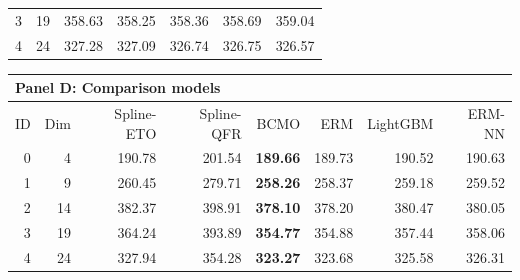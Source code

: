 \begin{table}[htbp]
\begin{tabular}{rrrrrrr}
3 & 19 & 358.63 & 358.25 & 358.36 & 358.69 & 359.04 \\
4 & 24 & 327.28 & 327.09 & 326.74 & 326.75 & 326.57 \\
\bottomrule
\end{tabular}
\par\medskip
\begin{tabular}{rrrrrrrr}
\toprule
\multicolumn{8}{l}{\textbf{Panel D: Comparison models}} \\
\midrule
ID & Dim & Spline-ETO & Spline-QFR & BCMO & ERM & LightGBM & ERM-NN \\
\midrule
0 & 4 & 190.78 & 201.54 & \textbf{189.66} & 189.73 & 190.52 & 190.63 \\
1 & 9 & 260.45 & 279.71 & \textbf{258.26} & 258.37 & 259.18 & 259.52 \\
2 & 14 & 382.37 & 398.91 & \textbf{378.10} & 378.20 & 380.47 & 380.05 \\
3 & 19 & 364.24 & 393.89 & \textbf{354.77} & 354.88 & 357.44 & 358.06 \\
4 & 24 & 327.94 & 354.28 & \textbf{323.27} & 323.68 & 325.58 & 326.31 \\
\bottomrule
\end{tabular}
\end{table}
